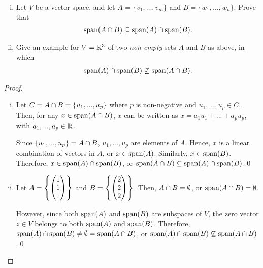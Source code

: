 \begin{question}\label{que:SpanIntersection}
    \normalfont

    \begin{enumerate}[(i)]
        \item Let $V$ be a vector space, and let $A$ = $\{v_1,\dots, v_m\}$ and $B=\{ w_1, \dots, w_n\}$.  Prove that
              \begin{align*}
                  \textnormal{span}(A\cap B) \subseteq \textnormal{span}(A)\cap\textnormal{span}(B).
              \end{align*}


        \item Give an example for $V={\mathbb R}^3$ of two \emph{non-empty} sets $A$ and $B$ as above, in which
              \begin{align*}
                  \textnormal{span}(A)\cap \textnormal{span}(B) \not\subseteq \textnormal{span}(A\cap B).
              \end{align*}


    \end{enumerate}
\end{question}

\begin{proof}
    \begin{enumerate}[(i)]
        \renewcommand{\qedsymbol}{$\blacksquare$}
        \item Let $C=A\cap B=\{u_1,...,u_p\}$ where $p$ is non-negative and $u_1,...,u_p\in C$.
        Then, for any $x\in\textnormal{span}(A\cap B)$, $x$ can be written as $x=a_1u_1+...+a_pu_p$, with $a_1,...,a_p\in\mathbb R$. 

        Since $\{u_1,...,u_p\}=A\cap B$, $u_1,...,u_p$ are elements of $A$. Hence, $x$ is a linear combination of vectors in $A$, or $x\in\textnormal{span}(A)$.
        Similarly, $x\in\textnormal{span}(B)$. Therefore, $x\in\textnormal{span}(A)\cap\textnormal{span}(B)$, or $\textnormal{span}(A\cap B)\subseteq\textnormal{span}(A)\cap\textnormal{span}(B)$.\qed
        \item Let $A=\left\{ \begin{pmatrix} 1\\ 1\\ 1\end{pmatrix}\right \}$ and $B=\left\{\begin{pmatrix} 2\\ 2\\ 2\end{pmatrix}\right\}$. Then, $A\cap B=\emptyset$, or $\textnormal{span}(A\cap B)=\emptyset$.
        
        However, since both $\textnormal{span}(A)$ and $\textnormal{span}(B)$ are subspaces of $V$, the zero vector $z\in V$ belongs to both $\textnormal{span}(A)$ and $\textnormal{span}(B)$. Therefore, $\textnormal{span}(A)\cap\textnormal{span}(B)\not=\emptyset=\textnormal{span}(A\cap B)$, or $\textnormal{span}(A)\cap\textnormal{span}(B)\not\subseteq\textnormal{span}(A\cap B)$.\qed
    \end{enumerate}
\end{proof}